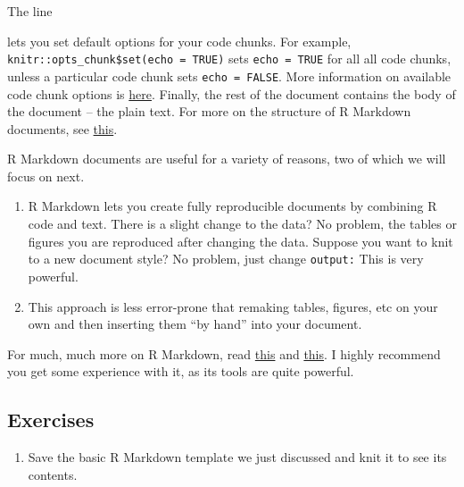 \documentclass[
]{book}
\newenvironment{Shaded}{\begin{snugshade}}{\end{snugshade}}
\newcommand{\NormalTok}[1]{#1}
\providecommand{\tightlist}{%
  \setlength{\itemsep}{0pt}\setlength{\parskip}{0pt}}
\begin{document}
The line

\begin{Shaded}
\end{Shaded}

lets you set default options for your code chunks. For example, \texttt{knitr::opts\_chunk\$set(echo\ =\ TRUE)} sets \texttt{echo\ =\ TRUE} for all all code chunks, unless a particular code chunk sets \texttt{echo\ =\ FALSE}. More information on available code chunk options is \href{https://yihui.org/knitr/options/}{here}. Finally, the rest of the document contains the body of the document -- the plain text.
For more on the structure of R Markdown documents, see \href{https://bookdown.org/yihui/rmarkdown-cookbook/conceptual-overview.html}{this}.

R Markdown documents are useful for a variety of reasons, two of which we will focus on next.

\begin{enumerate}
\def\labelenumi{\arabic{enumi}.}
\tightlist
\item
  R Markdown lets you create fully reproducible documents by combining R code and text. There is a slight change to the data? No problem, the tables or figures you are reproduced after changing the data. Suppose you want to knit to a new document style? No problem, just change \texttt{output:} This is very powerful.
\item
  This approach is less error-prone that remaking tables, figures, etc on your own and then inserting them ``by hand'' into your document.
\end{enumerate}

For much, much more on R Markdown, read \href{https://bookdown.org/yihui/rmarkdown/}{this} and \href{https://bookdown.org/yihui/rmarkdown-cookbook/}{this}. I highly recommend you get some experience with it, as its tools are quite powerful.

\hypertarget{ex-set12}{%
\subsection{Exercises}\label{ex-set12}}

\begin{enumerate}
\def\labelenumi{\arabic{enumi}.}
\tightlist
\item
  Save the basic R Markdown template we just discussed and knit it to see its contents.
\end{enumerate}
\end{document}
